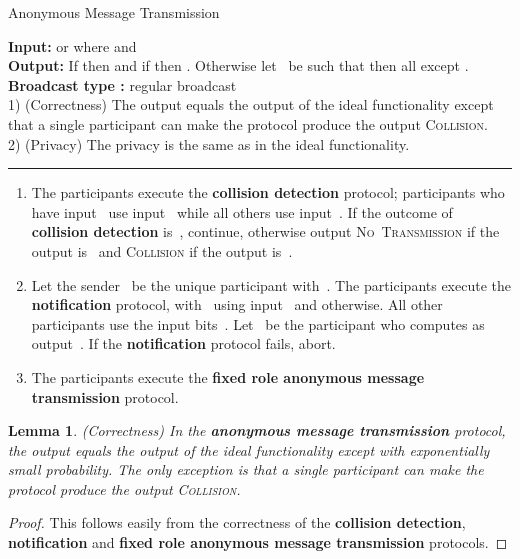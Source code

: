 \documentclass[11pt]{article}
\newtheorem{lemma}[theorem]{Lemma}
\begin{document}
\begin{protocol}
\caption{Anonymous Message Transmission}
\label{prot:anon-mess-trans}
{\bf Input:}  or  where  and   \\
{\bf Output:} If  then
 and if 
 then . Otherwise let~ be such that  then all  except . \\
{\bf Broadcast type :}  regular broadcast \\
1) (Correctness) The output equals the output of the ideal
functionality except that a single participant can make the protocol produce the output \textsc{Collision}.\\
2) (Privacy) The privacy is the same as in the ideal functionality.

\vspace{4pt} \hrule \vspace{4pt}


\begin{enumerate}
\item The participants execute the \textbf{collision detection} protocol; participants who have input~\mbox{} use input~ while all others use input~. If the
outcome of \textbf{collision detection} is~, continue, otherwise
output \textsc{No~Transmission} if the output is~ and
\textsc{Collision} if the output is~.

\item \label{anon-mess-trans-step-2} Let the sender~ be the unique participant with~. The participants execute the \textbf{notification} protocol,
with~ using input~ and  otherwise. All other
participants use the input bits~. Let~ be the participant who
computes as output~. If the \textbf{notification} protocol
fails, abort.

\item The participants execute the \textbf{fixed role anonymous message transmission}
protocol.

\end{enumerate}

\end{protocol}

\begin{lemma}(Correctness)
In the \textbf{anonymous message transmission} protocol, the output
equals the output of the ideal functionality except with
exponentially small probability. The only exception is  that a
single participant can make the protocol produce the output
\textsc{Collision}.
\end{lemma}

\begin{proof}
This follows easily from the correctness of the \textbf{collision
detection}, \textbf{notification} and \textbf{fixed role anonymous
message transmission} protocols.
\end{proof}
\end{document}
